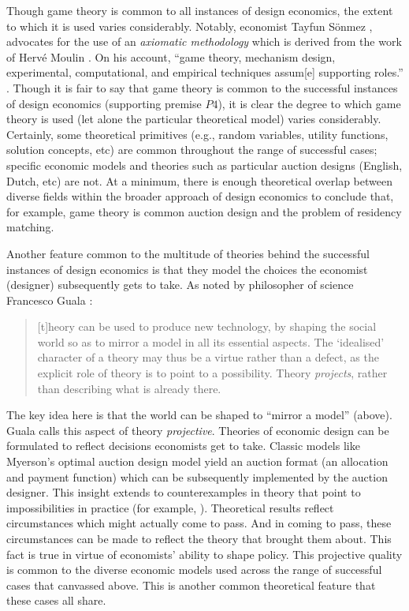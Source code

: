 Though game theory is common to all instances of design economics, the extent to which it is used varies considerably. Notably, economist Tayfun Sönmez \autocite*{sönmez2023minimalist}, advocates for the use of an \textit{axiomatic methodology} which is derived from the work of Hervé Moulin \autocite*{moulin1988}. On his account, ``game theory, mechanism design, experimental, computational, and empirical techniques assum[e] supporting roles.'' \autocite[13]{sönmez2023minimalist}. Though it is fair to say that game theory is common to the successful instances of design economics (supporting premise $P4$), it is clear the degree to which game theory is used (let alone the particular theoretical model) varies considerably. Certainly, some theoretical primitives (e.g., random variables, utility functions, solution concepts, etc) are common throughout the range of successful cases; specific economic models and theories such as particular auction designs (English, Dutch, etc) are not. At a minimum, there is enough theoretical overlap between diverse fields within the broader approach of design economics to conclude that, for example, game theory is common auction design and the problem of residency matching. 

Another feature common to the multitude of theories behind the successful instances of design economics is that they model the choices the economist (designer) subsequently gets to take. As noted by philosopher of science Francesco Guala \autocite*[456, emphasis original]{guala2001}:
\begin{quote}
    [t]heory can be used to produce new technology, by shaping the social world so as to mirror a model in all its essential aspects. The `idealised' character of a theory may thus be a virtue rather than a defect, as the explicit role of theory is to point to a possibility. Theory \textit{projects}, rather than describing what is already there.
\end{quote}
\noindent The key idea here is that the world can be shaped to ``mirror a model'' (above). Guala calls this aspect of theory \textit{projective}. Theories of economic design can be formulated to reflect decisions economists get to take. Classic models like Myerson's \autocite*{myerson1981} optimal auction design model yield an auction format (an allocation and payment function) which can be subsequently implemented by the auction designer. This insight extends to counterexamples in theory that point to impossibilities in practice (for example, \cite{myerson1983}). Theoretical results reflect circumstances which might actually come to pass. And in coming to pass, these circumstances can be made to reflect the theory that brought them about. This fact is true in virtue of economists' ability to shape policy. This projective quality is common to the diverse economic models used across the range of successful cases that canvassed above. This is another common theoretical feature that these cases all share.

